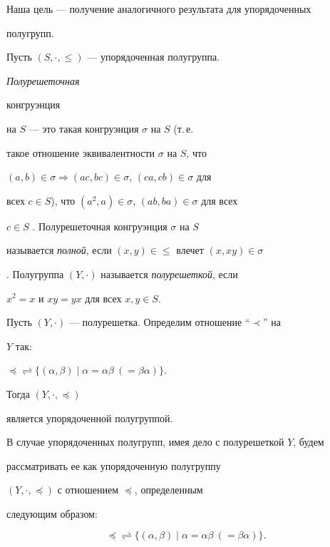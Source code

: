  


Наша цель --- получение аналогичного результата для упорядоченных 


полугрупп. 


 


Пусть $(S,\cdot,\le)$ --- упорядоченная полугруппа. {\it Полурешеточная 


конгруэнция} на $S$ --- это такая конгруэнция $\sigma$ на $S$ (т.\,е. 


такое отношение эквивалентности $\sigma$ на $S$, что 


$(a,b)\in\sigma\Rightarrow(ac,bc)\in\sigma$, $(ca,cb)\in\sigma$ для 


всех $c\in S$), что $(a^2,a)\in\sigma$, $(ab,ba)\in\sigma$ для всех 


$c\in S$ \cite{3}. Полурешеточная конгруэнция $\sigma$ на $S$ 


называется {\it полной}, если $(x,y)\in\le$ влечет $(x,xy)\in\sigma$ 


\cite{3}. Полугруппа $(Y,\cdot)$ называется {\it полурешеткой}, если 


$x^2=x$ и $xy=yx$ для всех $x,y\in S$. 


 


Пусть $(Y,\cdot)$ --- полурешетка. Определим отношение ``$\prec$'' на 


$Y$ так: 


$\preceq\rightleftharpoons\{(\alpha,\beta)\mid\alpha=\alpha\beta \ 


(=\beta\alpha)\}$. 


Тогда $(Y,\cdot,\preceq)$ 


является упорядоченной полугруппой. 


 


В случае упорядоченных полугрупп, имея дело с полурешеткой $Y$, будем 


рассматривать ее как упорядоченную полугруппу 


$(Y,\cdot,\preceq)$ с отношением $\preceq$, определенным 


следующим образом: 


$$ 


\preceq\rightleftharpoons\{(\alpha,\beta)\mid 


\alpha=\alpha\beta \ (=\beta\alpha)\}. 


$$ 


 


